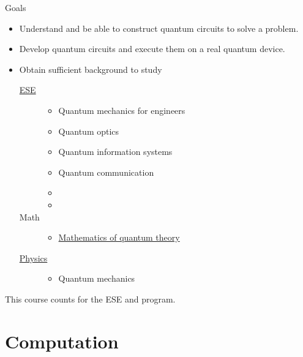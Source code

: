 \begin{frame}{Goals}
\begin{itemize}
    \item Understand and be able to construct quantum circuits to solve a problem.
    \item Develop quantum circuits and execute them on a real quantum device.
    \item Obtain sufficient background to study
    \begin{description}
        \item[\href{https://ese.wustl.edu/index.html}{ESE}] 
        \begin{itemize}
            \item Quantum mechanics for engineers
            \item Quantum optics
            \item Quantum information systems
            \item Quantum communication
            \item {} 
            \item {} 
        \end{itemize}
        \item [Math]
        \begin{itemize}
            \item \href{https://www.math.wustl.edu/~feres/Math528Spring19/Math528Spring19Syllabus.html}{Mathematics of quantum theory}
        \end{itemize}
        \item[\href{https://physics.wustl.edu/}{Physics}]
        \begin{itemize}
            \item Quantum mechanics
        \end{itemize}
    \end{description} 
\end{itemize}
This course counts for the ESE  and  program.
\end{frame}


\section{Computation}

